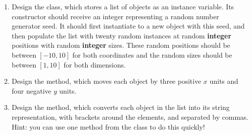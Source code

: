 \newpage %
\begin{enumerate}[label=(\alph*)]
    \item Design the  class, which stores a list of objects  as an instance variable. Its constructor should receive an integer representing a random number generator seed. It should first instantiate  to a new  object with this seed, and then populate the list with twenty random  instances at random \textbf{integer} positions with random \textbf{integer} sizes. These random positions should be between $[-10, 10]$ for both coordinates and the random sizes should be between $[1, 10]$ for both dimensions.

    \item Design the  method, which moves each object by three positive $x$ units and four negative $y$ units.

    \item Design the  method, which converts each object in the list into its string representation, with brackets around the elements, and separated by commas. Hint: you can use one method from the  class to do this quickly!
\end{enumerate}

